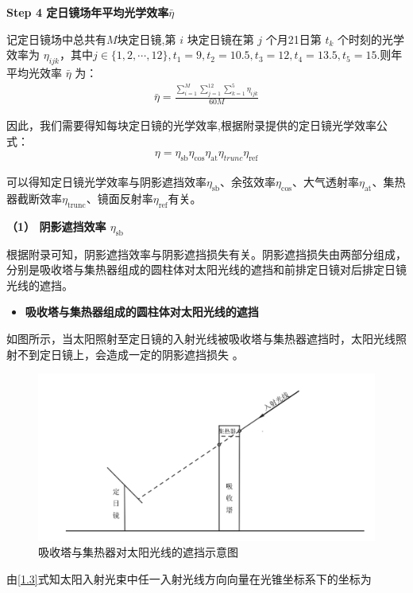 \documentclass[../main.tex]{subfiles}
\begin{document}
\noindent \textbf{Step 4 定日镜场年平均光学效率\(\bar{\eta}\)}
\par 记定日镜场中总共有$M$块定日镜,第 \(i\) 块定日镜在第 \(j\) 个月21日第 \(t_k\) 个时刻的光学效率为 \(\eta_{ijk}\)，其中$j\in \{1,2,\cdots,12\},t_1=9,t_2=10.5,t_3=12,t_4=13.5,t_5=15$.则年平均光效率 \(\bar{\eta}\) 为：
\begin{align}\label{1.50}
\bar{\eta}=\frac{\sum\limits_{i=1}^M{\sum\limits_{j=1}^{12}{\sum\limits_{k=1}^5{\eta _{ijk}}}}}{60M}
\end{align}
\par 因此，我们需要得知每块定日镜的光学效率,根据附录提供的定日镜光学效率公式：
\begin{align}\label{1.18}
\eta =\eta _{\text{sb}}\eta _{\cos}\eta _{\text{at}}\eta _{trunc}\eta _{\text{ref}}
  \end{align}
\par 可以得知定日镜光学效率与阴影遮挡效率$\eta_{\text{sb}}$、余弦效率$\eta_{\text{cos}}$、大气透射率$\eta_{\text{at}}$、集热器截断效率$\eta_{\text{trunc}}$、镜面反射率$\eta_{\text{ref}}$有关。
\par \textbf{（1） 阴影遮挡效率 $\eta_{\text{sb}}$}
\par 根据附录可知，阴影遮挡效率与阴影遮挡损失有关。阴影遮挡损失由两部分组成，分别是吸收塔与集热器组成的圆柱体对太阳光线的遮挡和前排定日镜对后排定日镜光线的遮挡。
\begin{itemize}
  \item \textbf{吸收塔与集热器组成的圆柱体对太阳光线的遮挡}
\end{itemize}
\par 如图所示，当太阳照射至定日镜的入射光线被吸收塔与集热器遮挡时，太阳光线照射不到定日镜上，会造成一定的阴影遮挡损失 。
 \begin{figure}[H]
\centering
\includegraphics[width=.9\textwidth]{6}
\caption{吸收塔与集热器对太阳光线的遮挡示意图}
\label{1.19}
\end{figure}
\par 由\eqref{1.3}式知太阳入射光束中任一入射光线方向向量在光锥坐标系下的坐标为
\end{document}

